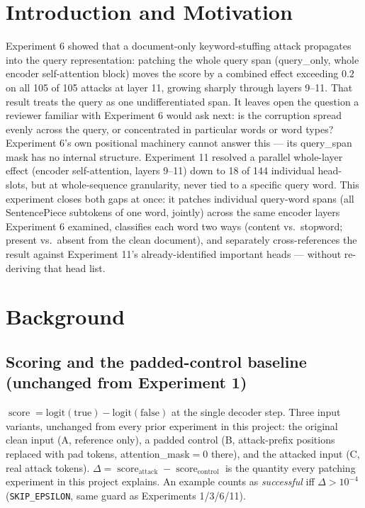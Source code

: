 \documentclass[11pt]{article}
\newcommand{\score}{\operatorname{score}}
\begin{document}
\tableofcontents
\newpage

\section{Introduction and Motivation}

Experiment 6 showed that a document-only keyword-stuffing attack propagates into the
query representation: patching the whole query span (query\_only, whole encoder
self-attention block) moves the score by a combined effect exceeding $0.2$ on all 105 of
105 attacks at layer 11, growing sharply through layers 9--11. That result treats the
query as one undifferentiated span. It leaves open the question a reviewer familiar with
Experiment 6 would ask next: is the corruption spread evenly across the query, or
concentrated in particular words or word types? Experiment 6's own positional machinery
cannot answer this — its query\_span mask has no internal structure. Experiment 11
resolved a parallel whole-layer effect (encoder self-attention, layers 9--11) down to 18
of 144 individual head-slots, but at whole-sequence granularity, never tied to a specific
query word. This experiment closes both gaps at once: it patches individual query-word
spans (all SentencePiece subtokens of one word, jointly) across the same encoder layers
Experiment 6 examined, classifies each word two ways (content vs.\ stopword; present vs.\
absent from the clean document), and separately cross-references the result against
Experiment 11's already-identified important heads — without re-deriving that head list.

\section{Background}

\subsection{Scoring and the padded-control baseline (unchanged from Experiment 1)}

$\score = \text{logit}(\text{true}) - \text{logit}(\text{false})$ at the single decoder
step. Three input variants, unchanged from every prior experiment in this project: the
original clean input (A, reference only), a padded control (B, attack-prefix positions
replaced with pad tokens, attention\_mask$=0$ there), and the attacked input (C, real
attack tokens). $\Delta = \score_{\text{attack}} - \score_{\text{control}}$ is the
quantity every patching experiment in this project explains. An example counts as
\emph{successful} iff $\Delta > 10^{-4}$ (\texttt{SKIP\_EPSILON}, same guard as
Experiments 1/3/6/11).
\end{document}
